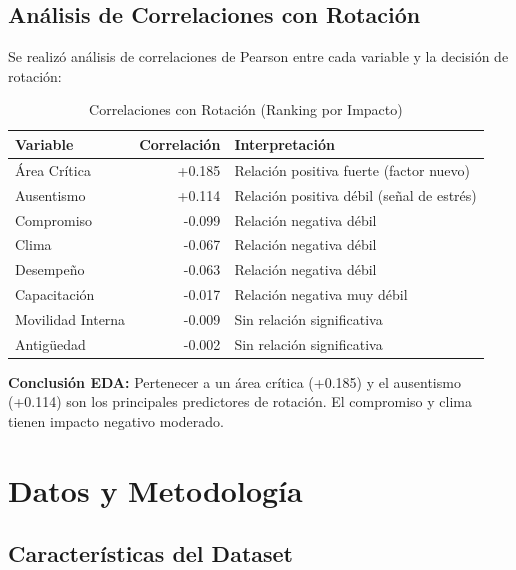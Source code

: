 \documentclass[11pt,a4paper,twoside]{article}
\begin{document}
\subsection{Análisis de Correlaciones con Rotación}

Se realizó análisis de correlaciones de Pearson entre cada variable y la decisión de rotación:

\begin{table}[H]
    \centering
    \caption{Correlaciones con Rotación (Ranking por Impacto)}
    \begin{tabular}{|l|r|l|}
        \toprule
        \textbf{Variable} & \textbf{Correlación} & \textbf{Interpretación} \\
        \midrule
        Área Crítica & +0.185 & Relación positiva fuerte (factor nuevo) \\
        Ausentismo & +0.114 & Relación positiva débil (señal de estrés) \\
        Compromiso & -0.099 & Relación negativa débil \\
        Clima & -0.067 & Relación negativa débil \\
        Desempeño & -0.063 & Relación negativa débil \\
        Capacitación & -0.017 & Relación negativa muy débil \\
        Movilidad Interna & -0.009 & Sin relación significativa \\
        Antigüedad & -0.002 & Sin relación significativa \\
        \bottomrule
    \end{tabular}
\end{table}

\textbf{Conclusión EDA:} Pertenecer a un área crítica (+0.185) y el ausentismo (+0.114) son los principales predictores de rotación. El compromiso y clima tienen impacto negativo moderado.

\newpage

\section{Datos y Metodología}

\subsection{Características del Dataset}
\end{document}
